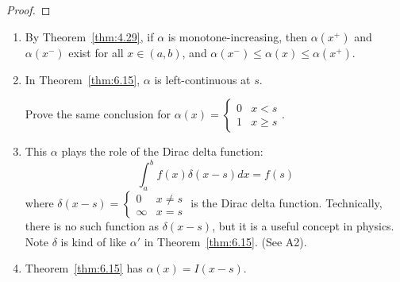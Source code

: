 \begin{thm}[15]
\begin{proof}
	\end{proof}
	\begin{remark}
		\begin{enumerate}
			\item By Theorem~\ref{thm:4.29}, if $\alpha$ is monotone-increasing,
			      then $\alpha(x^{+})$ and $\alpha(x^{-})$ exist for all $x \in (a,b)$, and $\alpha({x^{-}})\le \alpha(x)\le \alpha(x^{+})$.
			\item In Theorem~\ref{thm:6.15}, $\alpha$ is left-continuous at $s$.
			      \begin{exercise}
				      Prove the same conclusion for $\alpha(x)=\begin{cases}
						      0 & x<s    \\
						      1 & x\ge s
					      \end{cases}$.
			      \end{exercise}
			\item This $\alpha$ plays the role of the Dirac delta function:
			      \[
				      \int_{a}^{b}{f(x)\delta(x-s)dx}=f(s)
			      \]
			      where $\delta(x-s)=
				      \begin{cases}
					      0      & x\neq s \\
					      \infty & x=s
				      \end{cases}
			      $ is the Dirac delta function.
			      Technically, there is no such function as $\delta(x-s)$, but it is a useful concept in physics.
			      Note $\delta$ is kind of like $\alpha'$ in Theorem~\ref{thm:6.15}. (See A2).
			\item Theorem~\ref{thm:6.15} has $\alpha(x)=I(x-s)$.
		\end{enumerate}
	\end{remark}
\end{thm}


